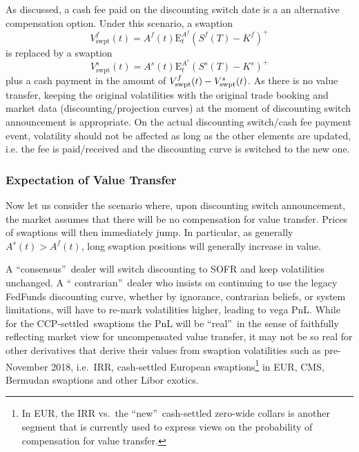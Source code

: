 \documentclass{article}
\begin{document}
As discussed, a cash fee paid on the discounting switch date is a an
alternative compensation option. Under this scenario, a swaption 
\begin{equation*}
V_{\mathrm{swpt}}^{f}(t)=A^{f}(t)\mathrm{E}_{t}^{A^{f}}(S^{f}(T)-K^{f})^{+}
\end{equation*}%
is replaced by a swaption 
\begin{equation*}
V_{\mathrm{swpt}}^{s}(t)=A^{s}(t)\mathrm{E}_{t}^{A^{s}}(S^{s}(T)-K^{s})^{+}
\end{equation*}%
plus a cash payment in the amount of $V_{\mathrm{swpt}}^{f}(t)-V_{\mathrm{%
swpt}}^{s}(t)$. As there is no value transfer, keeping the original
volatilities with the original trade booking and market data
(discounting/projection curves) at the moment of discounting switch
announcement is appropriate. On the actual discounting switch/cash fee
payment event, volatility should not be affected as long as the other
elements are updated, i.e. the fee is paid/received and the discounting
curve is switched to the new one.

\subsubsection{Expectation of Value Transfer}

Now let us consider the scenario where, upon discounting switch
announcement, the market assumes that there will be no compensation for
value transfer. Prices of swaptions will then immediately jump. In
particular, as generally $A^{s}(t)>A^{f}(t)$, long swaption positions will
generally increase in value.

A \textquotedblleft consensus\textquotedblright\ dealer will switch
discounting to SOFR and keep volatilities unchanged. A \textquotedblleft
contrarian\textquotedblright\ dealer who insists on continuing to use the
legacy FedFunds discounting curve, whether by ignorance, contrarian beliefs,
or system limitations, will have to re-mark volatilities higher, leading to
vega PnL. While for the CCP-settled\ swaptions the PnL will be
\textquotedblleft real\textquotedblright\ in the sense of faithfully
reflecting market view for uncompensated value transfer, it may not be so
real for other derivatives that derive their values from swaption
volatilities such as pre-November 2018, i.e.\ IRR, cash-settled European
swaptions\footnote{%
In EUR, the IRR vs.\ the \textquotedblleft new\textquotedblright\
cash-settled zero-wide collars is another segment that is currently used to
express views on the probability of compensation for value transfer.} in
EUR, CMS, Bermudan swaptions and other Libor exotics.
\end{document}
